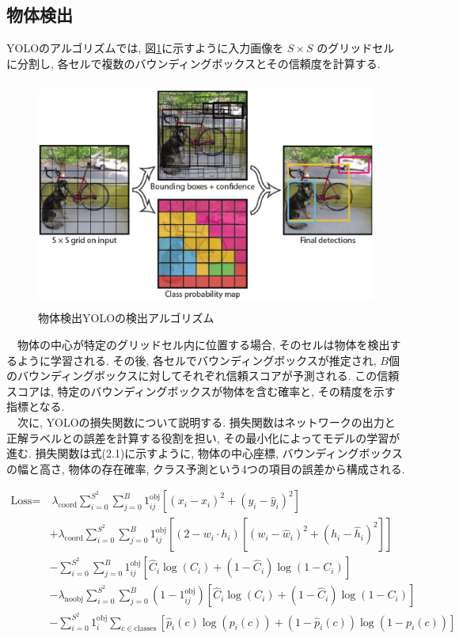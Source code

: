 \subsection{物体検出}
YOLOのアルゴリズムでは, 図\ref{fig:2-f4}に示すように入力画像を $S \times S$ のグリッドセルに分割し, 各セルで複数のバウンディングボックスとその信頼度を計算する. \\
\begin{figure}[htbt]
	\centering
	 \includegraphics[height=75mm]{Figure/YOLO.eps}
	 \caption{物体検出YOLOの検出アルゴリズム}
	 \label{fig:2-f4}
\end{figure}
　物体の中心が特定のグリッドセル内に位置する場合, そのセルは物体を検出するように学習される. 
その後, 各セルでバウンディングボックスが推定され, $B$個のバウンディングボックスに対してそれぞれ信頼スコアが予測される. 
この信頼スコアは, 特定のバウンディングボックスが物体を含む確率と, その精度を示す指標となる. \\
　次に, YOLOの損失関数について説明する. 損失関数はネットワークの出力と正解ラベルとの誤差を計算する役割を担い, その最小化によってモデルの学習が進む. 
損失関数は式(2.1)に示すように, 物体の中心座標, バウンディングボックスの幅と高さ, 物体の存在確率, クラス予測という4つの項目の誤差から構成される. 

\begin{align*}
	\text{Loss} = 
	&\ \lambda_{\text{coord}} \sum_{i=0}^{S^2} \sum_{j=0}^{B} 1^{\text{obj}}_{ij} 
	\left[ (x_i - \hat{x}_i)^2 + (y_i - \hat{y}_i)^2 \right] \\
	&+ \lambda_{\text{coord}} \sum_{i=0}^{S^2} \sum_{j=0}^{B} 1^{\text{obj}}_{ij} 
	\left[ (2 - w_i \cdot h_i) \left[ (w_i - \hat{w}_i)^2 + (h_i - \hat{h}_i)^2 \right] \right] \\
	&- \sum_{i=0}^{S^2} \sum_{j=0}^{B} 1^{\text{obj}}_{ij} 
	\left[ \hat{C}_i \log(C_i) + (1 - \hat{C}_i) \log(1 - C_i) \right] \\
	&- \lambda_{\text{noobj}} \sum_{i=0}^{S^2} \sum_{j=0}^{B} (1 - 1^{\text{obj}}_{ij}) 
	\left[ \hat{C}_i \log(C_i) + (1 - \hat{C}_i) \log(1 - C_i) \right] \\
	&- \sum_{i=0}^{S^2} 1^{\text{obj}}_i \sum_{c \in \text{classes}} 
	\left[ \hat{p}_i(c) \log(p_i(c)) + (1 - \hat{p}_i(c)) \log(1 - p_i(c)) \right]
	\tag{2.1}
\end{align*}

